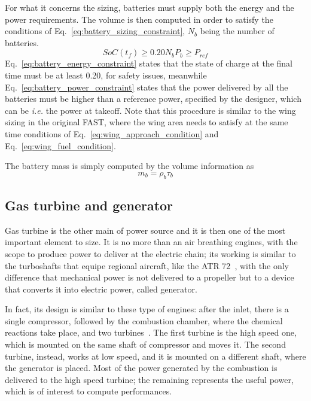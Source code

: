For what it concerns the sizing, batteries must supply both the energy and the power requirements. 
The volume is then computed in order to satisfy the conditions of Eq.~\eqref{eq:battery_sizing_constraint}, $N_b$ being the number of batteries.
\begin{subequations}
	\label{eq:battery_sizing_constraint}
	\begin{equation}
		\label{eq:battery_energy_constraint}
		SoC\left(t_f\right) \geq 0.20
	\end{equation}
	\begin{equation}
		\label{eq:battery_power_constraint}
		N_b P_b \geq P_{ref}
	\end{equation}
\end{subequations}
Eq.~\eqref{eq:battery_energy_constraint} states that the state of charge at the final time must be at least 0.20, for safety issues, meanwhile Eq.~\eqref{eq:battery_power_constraint} states that the power delivered by all the batteries must be higher than a reference power, specified by the designer, which can be \textit{i.e.} the power at takeoff.
Note that this procedure is similar to the wing sizing in the original FAST, where the wing area needs to satisfy at the same time conditions of Eq.~\eqref{eq:wing_approach_condition} and Eq.~\eqref{eq:wing_fuel_condition}. 

The battery mass is simply computed by the volume information as
\begin{equation}
	\label{eq:battery_mass}
	m_b = \rho_{b} \tau_{b}
\end{equation}

\subsection{Gas turbine and generator}
\label{subsec:chap3_gen_model}

Gas turbine is the other main of power source and it is then one of the most important element to size. 
It is no more than an air breathing engines, with the scope to produce power to deliver at the electric chain; its working is similar to the turboshafts that equipe regional aircraft, like the ATR 72~\cite{bib:roux_eng_data}, with the only difference that mechanical power is not delivered to a propeller but to a device that converts it into electric power, called generator. 

In fact, its design is similar to these type of engines: after the inlet, there is a single compressor, followed by the combustion chamber, where the chemical reactions take place, and two turbines~\cite{bib:mattingly}. 
The first turbine is the high speed one, which is mounted on the same shaft of compressor and moves it.
The second turbine, instead, works at low speed, and it is mounted on a different shaft, where the generator is placed. 
Most of the power generated by the combustion is delivered to the high speed turbine; the remaining represents the useful power, which is of interest to compute performances. 

